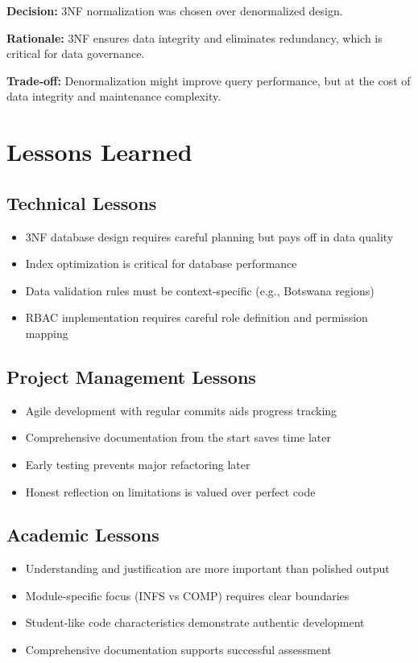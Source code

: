 \textbf{Decision:} 3NF normalization was chosen over denormalized design.

\textbf{Rationale:} 3NF ensures data integrity and eliminates redundancy, which is critical for data governance.

\textbf{Trade-off:} Denormalization might improve query performance, but at the cost of data integrity and maintenance complexity.

\section{Lessons Learned}

\subsection{Technical Lessons}

\begin{itemize}
    \item 3NF database design requires careful planning but pays off in data quality
    \item Index optimization is critical for database performance
    \item Data validation rules must be context-specific (e.g., Botswana regions)
    \item RBAC implementation requires careful role definition and permission mapping
\end{itemize}

\subsection{Project Management Lessons}

\begin{itemize}
    \item Agile development with regular commits aids progress tracking
    \item Comprehensive documentation from the start saves time later
    \item Early testing prevents major refactoring later
    \item Honest reflection on limitations is valued over perfect code
\end{itemize}

\subsection{Academic Lessons}

\begin{itemize}
    \item Understanding and justification are more important than polished output
    \item Module-specific focus (INFS vs COMP) requires clear boundaries
    \item Student-like code characteristics demonstrate authentic development
    \item Comprehensive documentation supports successful assessment
\end{itemize}

